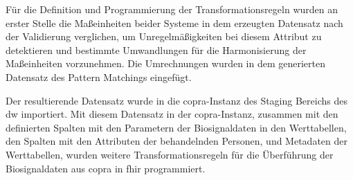 Für die Definition und Programmierung der Transformationsregeln wurden an erster Stelle die Maßeinheiten beider Systeme in dem erzeugten Datensatz nach der Validierung verglichen, um Unregelmäßigkeiten bei diesem Attribut zu detektieren und bestimmte Umwandlungen für die Harmonisierung der Maßeinheiten vorzunehmen. Die Umrechnungen wurden in dem generierten Datensatz des Pattern Matchings eingefügt.

Der resultierende Datensatz wurde in die \ac{copra}-Instanz des Staging Bereichs des \ac{dw} importiert. Mit diesem Datensatz in der \ac{copra}-Instanz, zusammen mit den definierten Spalten mit den Parametern der Biosignaldaten in den Werttabellen, den Spalten mit den Attributen der behandelnden Personen, und Metadaten der Werttabellen, wurden weitere Transformationsregeln für die Überführung der Biosignaldaten aus \ac{copra} in \ac{fhir} programmiert.